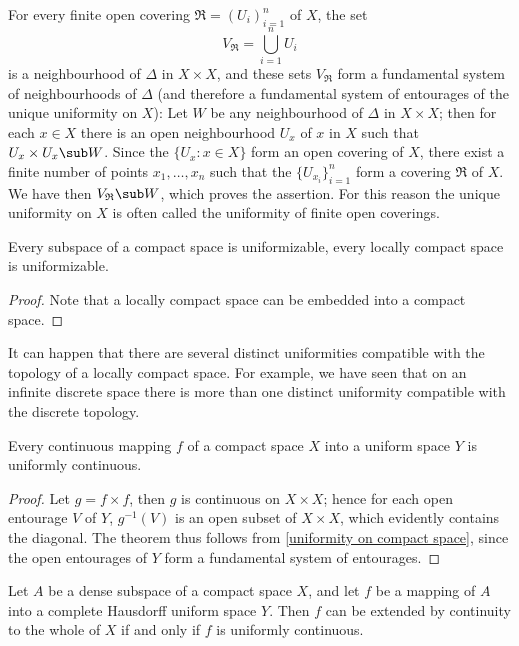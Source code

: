 \begin{remark}
For every finite open covering $\mathfrak{R}=(U_i)_{i=1}^{n}$ of $X$, the set
\[V_{\mathfrak{R}}=\bigcup_{i=1}^{n}U_i\]
is a neighbourhood of $\Delta$ in $X\times X$, and these sets $V_{\mathfrak{R}}$ form a fundamental system of neighbourhoods of $\Delta$ (and therefore a fundamental system of entourages of the unique uniformity on $X$): Let $W$ be any neighbourhood of $\Delta$ in $X\times X$; then for each $x\in X$ there is an open neighbourhood $U_x$ of $x$ in $X$ such that $U_x\times U_x\sub W$. Since the $\{U_x:x\in X\}$ form an open covering of $X$, there exist a finite number of points $x_1,\dots,x_n$ such that the $\{U_{x_i}\}_{i=1}^{n}$ form a covering $\mathfrak{R}$ of $X$. We have then $V_{\mathfrak{R}}\sub W$, which proves the assertion. For this reason the unique uniformity on $X$ is often called the uniformity of finite open coverings.
\end{remark}
\begin{corollary}
Every subspace of a compact space is uniformizable, every locally compact space is uniformizable.
\end{corollary}
\begin{proof}
Note that a locally compact space can be embedded into a compact space.
\end{proof}
It can happen that there are several distinct uniformities compatible with the topology of a locally compact space. For example, we have seen that on an infinite discrete space there is more than one distinct uniformity compatible with the discrete topology.
\begin{theorem}
Every continuous mapping $f$ of a compact space $X$ into a uniform space $Y$ is uniformly continuous.
\end{theorem}
\begin{proof}
Let $g=f\times f$, then $g$ is continuous on $X\times X$; hence for each open entourage $V$ of $Y$, $g^{-1}(V)$ is an open subset of $X\times X$, which evidently contains the diagonal. The theorem thus follows from \cref{uniformity on compact space}, since the open entourages of $Y$ form a fundamental system of entourages.
\end{proof}
\begin{corollary}
Let $A$ be a dense subspace of a compact space $X$, and let $f$ be a mapping of $A$ into a complete Hausdorff uniform space $Y$. Then $f$ can  be extended by continuity to the whole of $X$ if and only if $f$ is uniformly continuous.
\end{corollary}
